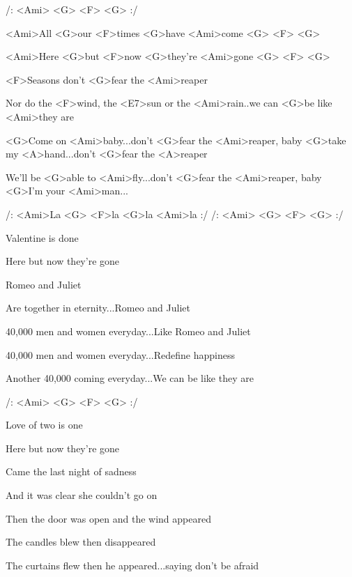 

/: <Ami> <G> <F> <G> :/



\zs 

<Ami>All <G>our <F>times <G>have <Ami>come <G> <F> <G>

<Ami>Here <G>but <F>now <G>they're <Ami>gone <G> <F> <G>

<F>Seasons don't <G>fear the <Ami>reaper

Nor do the <F>wind, the <E7>sun or the <Ami>rain..we can <G>be like <Ami>they are
\ks
 
\zr
<G>Come on <Ami>baby...don't <G>fear the <Ami>reaper, 
baby <G>take my <A>hand...don't <G>fear the <A>reaper

We'll be <G>able to <Ami>fly...don't <G>fear the <Ami>reaper,
baby <G>I'm your <Ami>man...
 
/: <Ami>La <G>  <F>la <G>la <Ami>la :/
/: <Ami> <G> <F> <G>  :/
\kr 


\zs 
Valentine is done

Here but now they're gone

Romeo and Juliet

Are together in eternity...Romeo and Juliet

40,000 men and women everyday...Like Romeo and Juliet

40,000 men and women everyday...Redefine happiness

Another 40,000 coming everyday...We can be like they are
\ks

\zr 
\kr
 
/: <Ami> <G> <F> <G> :/
 
\zs

Love of two is one

Here but now they're gone

Came the last night of sadness

And it was clear she couldn't go on

Then the door was open and the wind appeared

The candles blew then disappeared

The curtains flew then he appeared...saying don't be afraid
\ks

\zr 
\kr


\kp

